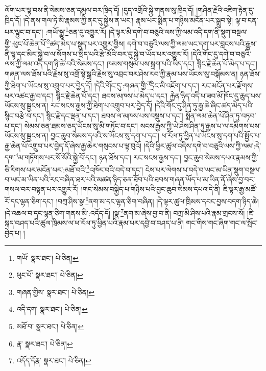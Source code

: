 ལོག་པར་ལྟ་བས་ནི་སེམས་ཅན་དམྱལ་བར་ཁྲིད་དོ། །དུད་འགྲོའི་སྐྱེ་གནས་སུ་ཁྲིད་དོ། །གཤིན་རྗེའི་འཇིག་རྟེན་དུ་ཁྲིད་དོ། །དེ་ནས་གལ་ཏེ་མི་རྣམས་ཀྱི་ནང་དུ་སྐྱེས་ན་ཡང་། རྣམ་པར་སྨིན་པ་གཉིས་མངོན་པར་སྒྲུབ་སྟེ། ལྟ་བ་ངན་པར་ལྟུང་བ་དང་། :གཡོ་སྒྱུ་\footnote{གཡོ་  སྣར་ཐང་།  པེ་ཅིན། }ཅན་དུ་འགྱུར་རོ། །དེ་ལྟར་མི་དགེ་བ་བཅུའི་ལས་ཀྱི་ལམ་འདི་དག་ནི་སྡུག་བསྔལ་གྱི་:ཕུང་པོ་ཆེན་པོ་\footnote{ཕུང་པོ་  སྣར་ཐང་།  པེ་ཅིན། }ཚད་མེད་པ་སྡུད་པར་འགྱུར་གྱིས། དགེ་བ་བཅུའི་ལས་ཀྱི་ལམ་ཡང་དག་པར་བླངས་པའི་རྒྱུས་ནི་ལྷ་དང་མིར་སྐྱེ་བ་ལ་སོགས་པ་སྲིད་པའི་རྩེ་མོའི་བར་དུ་སྐྱེ་བ་ཡོད་པར་འགྱུར་རོ། །དེའི་གོང་དུ་དགེ་བ་བཅུའི་ལས་ཀྱི་ལམ་འདི་དག་ཉི་ཚེ་བའི་སེམས་དང་། ཁམས་གསུམ་པས་སྐྲག་པའི་ཡིད་དང་། སྙིང་རྗེ་ཆེན་པོ་མེད་པ་དང་། གཞན་ལས་ཐོས་པའི་རྗེས་སུ་འགྲོ་སྟེ་སྒྲའི་རྗེས་སུ་འབྲང་བར་ཤེས་རབ་ཀྱི་རྣམ་པས་ཡོངས་སུ་བསྒོམས་ན། ཉན་ཐོས་ཀྱི་ཐེག་པ་ཡོངས་སུ་འགྲུབ་པར་བྱེད་དོ། །དེའི་གོང་དུ་:གཞན་གྱི་\footnote{གཞན་གྱིས་  སྣར་ཐང་།  པེ་ཅིན། }དྲིང་མི་འཇོག་པ་དང་། རང་མངོན་པར་རྫོགས་པར་འཚང་རྒྱ་བ་དང་། སྙིང་རྗེ་ཆེན་པོ་དང་། ཐབས་མཁས་པ་མེད་པ་དང་། རྐྱེན་ཉིད་འདི་པ་ཟབ་མོ་ཁོང་དུ་ཆུད་པས་ཡོངས་སུ་སྦྱངས་ན། རང་སངས་རྒྱས་ཀྱི་ཐེག་པ་འགྲུབ་པར་བྱེད་དོ། །དེའི་གོང་དུ་ཤིན་ཏུ་རྒྱ་ཆེ་ཞིང་ཚད་མེད་པའི་སྙིང་བརྩེ་བ་དང་། སྙིང་རྗེ་དང་ལྡན་པ་དང་། ཐབས་ལ་མཁས་པས་བསྡུས་པ་དང་། སྨོན་ལམ་ཆེན་པོ་ཤིན་ཏུ་བཏབ་པ་དང་། སེམས་ཅན་ཐམས་ཅད་ཡོངས་སུ་མི་གཏོང་བ་དང་། སངས་རྒྱས་ཀྱི་ཡེ་ཤེས་ཤིན་ཏུ་རྒྱས་པ་ལ་དམིགས་པས་ཡོངས་སུ་སྦྱངས་ན། བྱང་ཆུབ་སེམས་དཔའི་ས་ཡོངས་སུ་དག་པ་དང་། ཕ་རོལ་ཏུ་ཕྱིན་པ་ཡོངས་སུ་དག་པའི་སྤྱོད་པ་རྒྱ་ཆེན་པོ་འགྲུབ་པར་བྱེད་དོ་ཞེས་རྒྱ་ཆེར་གསུངས་པ་ལྟ་བུའོ། །དེའི་ཕྱིར་ཚུལ་འདིས་དགེ་བ་བཅུའི་ལས་ཀྱི་ལམ་:དེ་དག་\footnote{འདི་དག་  སྣར་ཐང་།  པེ་ཅིན། }མ་གཏོགས་པར་སོ་སོའི་སྐྱེ་བོ་དང་། ཉན་ཐོས་དང་། རང་སངས་རྒྱས་དང་། བྱང་ཆུབ་སེམས་དཔའ་རྣམས་ཀྱི་ཅི་རིགས་པར་མངོན་པར་:མཐོ་བའི་\footnote{མཐོ་བ་  སྣར་ཐང་།  པེ་ཅིན། }འཁོར་བའི་བདེ་བ་དང་། ངེས་པར་ལེགས་པ་བདེ་བ་ཡང་མ་ཡིན་སྡུག་བསྔལ་བ་ཡང་མ་ཡིན་པའི་རང་བཞིན་ཐར་པའི་མཚན་ཉིད་ཅན་ཐོབ་པའི་ཐབས་གཞན་ཡོད་པ་མ་ཡིན་ནོ་ཞེས་བྱ་བར་གསལ་བར་བསྟན་པར་འགྱུར་རོ། །གང་སེམས་བསྐྱེད་པ་གཉིས་པའི་བྱང་ཆུབ་སེམས་དཔའ་དེ་ནི། ཇི་ལྟར་རྒྱ་མཚོ་རོ་དང་ལྷན་ཅིག་དང་། །བཀྲ་ཤིས་སྣ་\footnote{རྣ་  སྣར་ཐང་།  པེ་ཅིན། }ནག་མ་དང་ལྷན་ཅིག་བཞིན། །དེ་ལྟར་ཚུལ་ཁྲིམས་དབང་བྱས་བདག་ཉིད་ཆེ། །དེ་འཆལ་བ་དང་ལྷན་ཅིག་གནས་མི་:འདོད་དོ། །སྣ་\footnote{འདོད་དོརྣ་  སྣར་ཐང་།  པེ་ཅིན། }ནག་མ་ཞེས་བྱ་བ་ནི། བཀྲ་མི་ཤིས་པའི་རྣམ་གྲངས་སོ། །ཇི་སྐད་བཤད་པའི་ཚུལ་ཁྲིམས་ལ་ཕ་རོལ་ཏུ་ཕྱིན་པའི་རྣམ་པར་དབྱེ་བ་བཤད་པ་ནི། གང་གིས་གང་ཞིག་གང་ལ་སྤོང་བྱེད་པ། །
